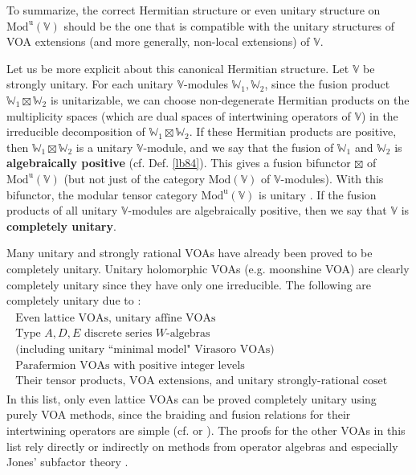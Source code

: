 \documentclass[11pt,b5paper,notitlepage]{article}
\theoremstyle{definition}
\theoremstyle{plain}
\newcommand{\uni}{\mathrm{u}}
\newcommand{\Vbb}{\mathbb V}
\newcommand{\Wbb}{\mathbb W}
\newcommand{\Mod}{\mathrm{Mod}}
\numberwithin{equation}{section}
\begin{document}
To summarize, the correct Hermitian structure or even unitary structure on $\Mod^\uni(\Vbb)$ should be the one that is compatible with the unitary structures of VOA extensions (and more generally, non-local extensions) of $\Vbb$.

Let us be more explicit about this canonical Hermitian structure. Let $\Vbb$ be strongly unitary. For each unitary $\Vbb$-modules $\Wbb_1,\Wbb_2$, since the fusion product $\Wbb_1\boxtimes\Wbb_2$ \cite{HL95a,HL95b,HL95c,Hua95} is unitarizable, we can choose non-degenerate Hermitian products on the multiplicity spaces (which are dual spaces of intertwining operators of $\Vbb$) in the irreducible decomposition of $\Wbb_1\boxtimes\Wbb_2$. If these Hermitian products are positive, then $\Wbb_1\boxtimes\Wbb_2$ is a unitary $\Vbb$-module, and we say that the fusion of $\Wbb_1$ and $\Wbb_2$ is \textbf{algebraically positive} (cf. Def. \ref{lb84}). This gives a fusion bifunctor $\boxtimes$ of $\Mod^\uni(\Vbb)$ (but not just of the category $\Mod(\Vbb)$ of $\Vbb$-modules). With this bifunctor, the modular tensor category $\Mod^\uni(\Vbb)$ is unitary \cite{Gui19b}. If the fusion products of all unitary $\Vbb$-modules are algebraically positive, then we say that $\Vbb$ is \textbf{completely unitary}.


Many unitary and strongly rational VOAs have already been proved to be completely unitary. Unitary holomorphic VOAs (e.g. moonshine VOA) are clearly completely unitary since they have only one irreducible. The following are completely unitary due to \cite{Gui19b,Gui19c,Ten19c,Gui22,Gui20,CGGH23}:
\begin{gather}\label{eq99}
\begin{gathered}
\text{Even lattice VOAs, unitary affine VOAs}\\
\text{Type $A,D,E$ discrete series $W$-algebras}\\
\text{(including unitary ``minimal model" Virasoro VOAs)}\\
\text{Parafermion VOAs with positive integer levels}\\
\text{Their tensor products, VOA extensions, and unitary strongly-rational coset VOAs}
\end{gathered}
\end{gather}
In this list, only even lattice VOAs can be proved completely unitary using purely VOA methods, since the braiding and fusion relations for their intertwining operators are simple (cf. \cite{DL12} or \cite[Sec. A]{Gui19c}). The proofs for the other VOAs in this list rely directly or indirectly on methods from operator algebras and especially Jones' subfactor theory \cite{Jon83}.
\end{document}
